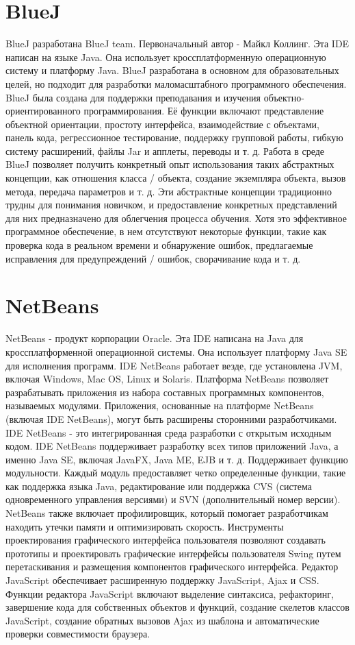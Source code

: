 \section{BlueJ}
BlueJ разработана BlueJ team. Первоначальный автор - Майкл Коллинг. Эта IDE написан на языке Java. 
Она использует кроссплатформенную операционную систему и платформу Java. BlueJ разработана в 
основном для образовательных целей, но подходит для разработки маломасштабного программного 
обеспечения. BlueJ была создана для поддержки преподавания и изучения объектно-ориентированного
программирования. Её функции включают представление объектной ориентации, простоту интерфейса,
взаимодействие с объектами, панель кода, регрессионное тестирование, поддержку групповой работы, 
гибкую систему расширений, файлы Jar и апплеты, переводы и т. д. Работа в среде BlueJ позволяет
получить конкретный опыт использования таких абстрактных концепции, как отношения класса / объекта,
создание экземпляра объекта, вызов метода, передача параметров и т. д. Эти абстрактные концепции
традиционно трудны для понимания новичком, и предоставление конкретных представлений для них 
предназначено для облегчения процесса обучения. Хотя это эффективное программное обеспечение, в нем отсутствуют некоторые функции, такие как проверка кода в реальном времени и обнаружение ошибок,
предлагаемые исправления для предупреждений / ошибок, сворачивание кода и т. д.\\

\section{NetBeans}
NetBeans - продукт корпорации Oracle. Эта IDE написана на Java для кроссплатформенной операционной 
системы. Она использует платформу Java SE для исполнения программ. IDE NetBeans работает везде, 
где установлена JVM, включая Windows, Mac OS, Linux и Solaris. Платформа NetBeans позволяет 
разрабатывать приложения из набора составных программных компонентов, называемых модулями. 
Приложения, основанные на платформе NetBeans (включая IDE NetBeans), могут быть расширены 
сторонними разработчиками. IDE NetBeans - это интегрированная среда разработки с открытым исходным 
кодом. IDE NetBeans поддерживает разработку всех типов приложений Java, а именно Java SE, включая 
JavaFX, Java ME, EJB и т. д. Поддерживает функцию модульности. Каждый модуль предоставляет четко
определенные функции, такие как поддержка языка Java, редактирование или поддержка CVS (система
одновременного управления версиями) и SVN (дополнительный номер версии). NetBeans также включает 
профилировщик, который помогает разработчикам находить утечки памяти и оптимизировать скорость. 
Инструменты проектирования графического интерфейса пользователя позволяют создавать прототипы и
проектировать графические интерфейсы пользователя Swing путем перетаскивания и размещения 
компонентов графического интерфейса. Редактор JavaScript обеспечивает расширенную поддержку 
JavaScript, Ajax и CSS. Функции редактора JavaScript включают выделение синтаксиса, рефакторинг, 
завершение кода для собственных объектов и функций, создание скелетов классов JavaScript, 
создание обратных вызовов Ajax из шаблона и автоматические проверки совместимости браузера.\\

